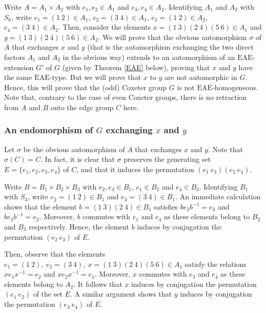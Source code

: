\documentclass[a4paper, 11pt]{amsart}
\theoremstyle{definition}
\theoremstyle{remark}
\begin{document}
\smallskip \noindent
Write $A=A_1\times A_2$ with $e_1,e_2\in A_1$ and $e_3,e_4\in A_2$. Identifying $A_1$ and $A_2$ with $S_6$, write $e_1=(1 \ 2)\in A_1$, $e_2=(3 \ 4)\in A_1$, $e_3=(1 \ 2)\in A_2$, $e_4=(3 \ 4)\in A_2$. Then, consider the elements $x=(1 \ 3)(2 \ 4)(5 \ 6)\in A_1$ and $y=(1 \ 3)(2 \ 4)(5 \ 6)\in A_2$. We will prove that the obvious automorphism $\sigma$ of $A$ that exchanges $x$ and $y$ (that is the automorphism exchanging the two direct factors $A_1$ and $A_2$ in the obvious way) extends to an automorphism of an $\mathrm{EAE}$-extension $G'$ of $G$ (given by Theorem \ref{EAE} below), proving that $x$ and $y$ have the same $\mathrm{EAE}$-type. But we will prove that $x$ to $y$ are not automorphic in $G$. Hence, this will prove that the (odd) Coxeter group $G$ is not $\mathrm{EAE}$-homogeneous. Note that, contrary to the case of even Coxeter groups, there is no retraction from $A$ and $B$ onto the edge group $C$ here.

\subsubsection{An endomorphism of $G$ exchanging $x$ and $y$}\label{endo}

Let $\sigma$ be the obvious automorphism of $A$ that exchanges $x$ and $y$. Note that $\sigma(C)=C$. In fact, it is clear that $\sigma$ preserves the generating set $E=\lbrace e_1,e_2,e_3,e_4\rbrace$ of $C$, and that it induces the permutation $(e_1 \ e_3)(e_2 \ e_4)$.

\smallskip \noindent
Write $B=B_1\times B_2\times B_3$ with $e_2,e_3\in B_1$, $e_1\in B_2$ and $e_4\in B_3$. Identifying $B_1$ with $S_4$, write $e_2=(1 \ 2)\in B_1$ and $e_3=(3 \ 4)\in B_1$. An immediate calculation shows that the element $b=(1 \ 3)(2 \ 4)\in B_1$ satisfies $be_2b^{-1}=e_3$ and $be_3b^{-1}=e_2$. Moreover, $b$ commutes with $e_1$ and $e_4$ as these elements belong to $B_2$ and $B_3$ respectively. Hence, the element $b$ induces by conjugation the permutation $(e_2 \ e_3)$ of $E$. 

\smallskip \noindent
Then, observe that the elements $e_1=(1 \ 2), \ e_2=(3 \ 4), \ x=(1 \ 3)(2 \ 4)(5 \ 6)\in A_1$ satisfy the relations $xe_1x^{-1}=e_2$ and $xe_2x^{-1}=e_1$. Moreover, $x$ commutes with $e_3$ and $e_4$ as these elements belong to $A_2$. It follows that $x$ induces by conjugation the permutation $(e_1 \ e_2)$ of the set $E$. A similar argument shows that $y$ induces by conjugation the permutation $(e_3 \ e_4)$ of $E$.
\end{document}
